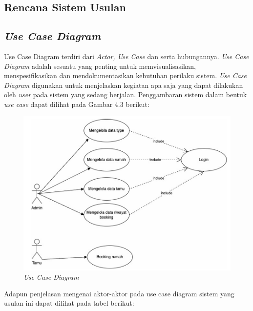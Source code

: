 \subsection{Rencana Sistem Usulan}
\subsection{\textit{Use Case Diagram}}
\par Use Case Diagram terdiri dari \textit{Actor, Use Case} dan serta hubungannya. \textit{Use Case Diagram} adalah sesuatu yang penting untuk memvisualisasikan, menspesifikasikan dan mendokumentasikan kebutuhan perilaku sistem. \textit{Use Case Diagram} digunakan untuk menjelaskan kegiatan apa saja yang dapat dilakukan oleh \textit{user} pada sistem yang sedang berjalan. Penggambaran sistem dalam bentuk \textit{use case} dapat dilihat pada Gambar 4.3 berikut:
\begin{figure}
    \centering
    \includegraphics[width=1.0\linewidth]{Use Case Diagram.png}
    \caption{\textit{Use Case Diagram}}
    \label{fig:enter-label}
\end{figure}


    \par Adapun penjelasan mengenai aktor-aktor pada use case diagram sistem yang usulan ini dapat dilihat pada tabel berikut:

